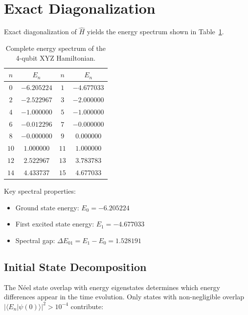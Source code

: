 \documentclass[11pt,a4paper]{article}
\begin{document}
\section{Exact Diagonalization}

Exact diagonalization of $\hat{H}$ yields the energy spectrum shown in Table~\ref{tab:eigenvalues}.

\begin{table}[H]
\centering
\caption{Complete energy spectrum of the 4-qubit XYZ Hamiltonian.}
\label{tab:eigenvalues}
\begin{tabular}{cc|cc}
\toprule
$n$ & $E_n$ & $n$ & $E_n$ \\
\midrule
$0$ & $-6.205224$ & $1$ & $-4.677033$ \\
$2$ & $-2.522967$ & $3$ & $-2.000000$ \\
$4$ & $-1.000000$ & $5$ & $-1.000000$ \\
$6$ & $-0.012296$ & $7$ & $-0.000000$ \\
$8$ & $-0.000000$ & $9$ & $0.000000$ \\
$10$ & $1.000000$ & $11$ & $1.000000$ \\
$12$ & $2.522967$ & $13$ & $3.783783$ \\
$14$ & $4.433737$ & $15$ & $4.677033$ \\
\bottomrule
\end{tabular}
\end{table}

Key spectral properties:
\begin{itemize}
    \item Ground state energy: $E_0 = -6.205224$
    \item First excited state energy: $E_1 = -4.677033$
    \item Spectral gap: $\Delta E_{01} = E_1 - E_0 = 1.528191$
\end{itemize}

\subsection{Initial State Decomposition}

The N\'eel state overlap with energy eigenstates determines which energy differences appear in the time evolution.
Only states with non-negligible overlap $| \langle E_n | \psi(0) \rangle |^2 > 10^{-4}$ contribute:
\end{document}
